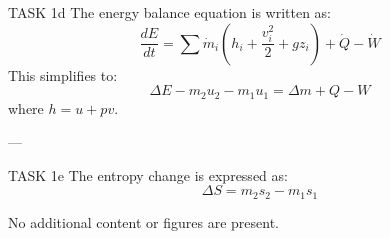 TASK 1d  
The energy balance equation is written as:  
\[
\frac{dE}{dt} = \sum \dot{m}_i \left( h_i + \frac{v_i^2}{2} + gz_i \right) + \dot{Q} - \dot{W}
\]  
This simplifies to:  
\[
\Delta E - m_2 u_2 - m_1 u_1 = \Delta m + Q - W
\]  
where \( h = u + pv \).  

---

TASK 1e  
The entropy change is expressed as:  
\[
\Delta S = m_2 s_2 - m_1 s_1
\]  

No additional content or figures are present.
